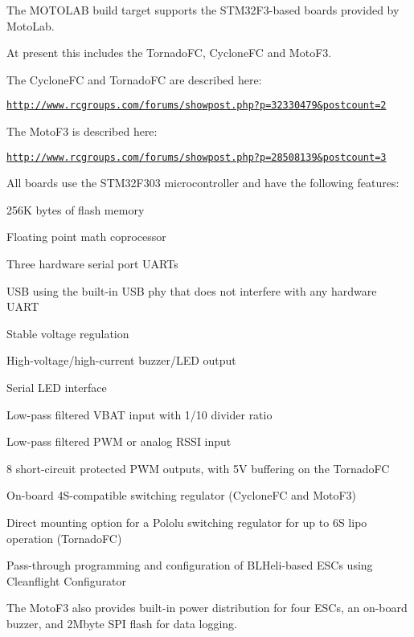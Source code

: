 The M\+O\+T\+O\+L\+A\+B build target supports the S\+T\+M32\+F3-\/based boards provided by Moto\+Lab.

At present this includes the Tornado\+F\+C, Cyclone\+F\+C and Moto\+F3.

The Cyclone\+F\+C and Tornado\+F\+C are described here\+:

\href{http://www.rcgroups.com/forums/showpost.php?p=32330479&postcount=2}{\tt http\+://www.\+rcgroups.\+com/forums/showpost.\+php?p=32330479\&postcount=2}

The Moto\+F3 is described here\+:

\href{http://www.rcgroups.com/forums/showpost.php?p=28508139&postcount=3}{\tt http\+://www.\+rcgroups.\+com/forums/showpost.\+php?p=28508139\&postcount=3}

All boards use the S\+T\+M32\+F303 microcontroller and have the following features\+:


\begin{DoxyItemize}
\item 256\+K bytes of flash memory
\item Floating point math coprocessor
\item Three hardware serial port U\+A\+R\+Ts
\item U\+S\+B using the built-\/in U\+S\+B phy that does not interfere with any hardware U\+A\+R\+T
\item Stable voltage regulation
\item High-\/voltage/high-\/current buzzer/\+L\+E\+D output
\item Serial L\+E\+D interface
\item Low-\/pass filtered V\+B\+A\+T input with 1/10 divider ratio
\item Low-\/pass filtered P\+W\+M or analog R\+S\+S\+I input
\item 8 short-\/circuit protected P\+W\+M outputs, with 5\+V buffering on the Tornado\+F\+C
\item On-\/board 4\+S-\/compatible switching regulator (Cyclone\+F\+C and Moto\+F3)
\item Direct mounting option for a Pololu switching regulator for up to 6\+S lipo operation (Tornado\+F\+C)
\item Pass-\/through programming and configuration of B\+L\+Heli-\/based E\+S\+Cs using Cleanflight Configurator
\end{DoxyItemize}

The Moto\+F3 also provides built-\/in power distribution for four E\+S\+Cs, an on-\/board buzzer, and 2\+Mbyte S\+P\+I flash for data logging.

